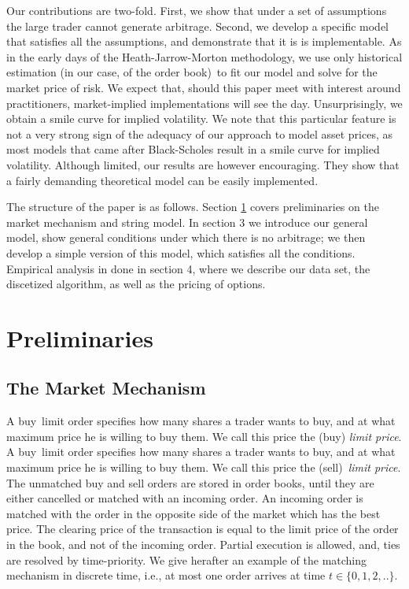 \documentclass{article}
\begin{document}
Our contributions are two-fold. First, we show that under a set of
assumptions the large trader cannot generate arbitrage. Second, we develop a
specific model that satisfies all the assumptions, and demonstrate that it
is is implementable. As in the early days of the Heath-Jarrow-Morton
methodology, we use only historical estimation (in our case, of the order
book)\ to fit our model and solve for the market price of risk. We expect
that, should this paper meet with interest around practitioners,
market-implied implementations will see the day. Unsurprisingly, we obtain a
smile curve for implied volatility. We note that this particular feature is
not a very strong sign of the adequacy of our approach to model asset
prices, as most models that came after Black-Scholes \cite{BS73} result in a
smile curve for implied volatility. Although limited, our results are
however encouraging. They show that a fairly demanding theoretical model can
be easily implemented.

The structure of the paper is as follows. Section \ref{sec::pre} covers
preliminaries on the market mechanism and string model. In section 3 we
introduce our general model, show general conditions under which there is no
arbitrage; we then develop a simple version of this model, which satisfies
all the conditions. Empirical analysis in done in section 4, where we
describe our data set, the discetized algorithm, as well as the pricing of
options.

\section{Preliminaries}

\label{sec::pre}

\subsection{The Market Mechanism}

\noindent A buy\ limit order specifies how many shares a trader wants to
buy, and at what maximum price he is willing to buy them. We call this price
the (buy) \textit{limit price}. A buy\ limit order specifies how many shares
a trader wants to buy, and at what maximum price he is willing to buy them.
We call this price the (sell)\ \textit{limit price}. The unmatched buy and
sell orders are stored in order books, until they are either cancelled or
matched with an incoming order. An incoming order is matched with the order
in the opposite side of the market which has the best price. The clearing
price of the transaction is equal to the limit price of the order in the
book, and not of the incoming order. Partial execution is allowed, and, ties
are resolved by time-priority. We give herafter an example of the matching
mechanism in discrete time, i.e., at most one order arrives at time $t\in
\{0,1,2,..\}.$
\end{document}
